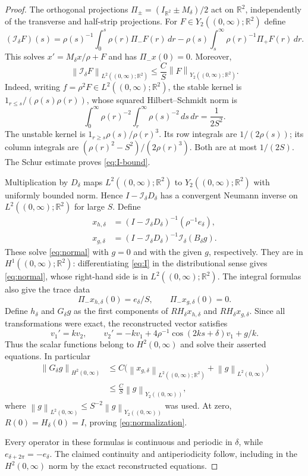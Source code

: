 \documentclass[11pt,a4paper]{article}
\newcommand{\R}{\mathbb R}
\newcommand{\Ical}{\mathcal I}
\newcommand{\norm}[1]{\left\lVert#1\right\rVert}
\begin{document}
\begin{proof}
The orthogonal projections $\Pi_\pm=(I_{\R^2}\pm M_\delta)/2$ act on
$\R^2$, independently of the transverse and half-strip projections.
For $F\in Y_2((0,\infty);\R^2)$ define
\begin{equation}\label{eq:I}
 (\Ical_\delta F)(s)
 =\rho(s)^{-1}\int_0^s\rho(r)\Pi_-F(r)\,dr
  -\rho(s)\int_s^\infty\rho(r)^{-1}\Pi_+F(r)\,dr.
\end{equation}
This solves $x'=M_\delta x/\rho+F$ and has $\Pi_-x(0)=0$. Moreover,
\begin{equation}\label{eq:I-bound}
 \norm{\Ical_\delta F}_{L^2((0,\infty);\R^2)}
 \le\frac CS\norm{F}_{Y_2((0,\infty);\R^2)}.
\end{equation}
Indeed, writing $f=\rho^2F\in L^2((0,\infty);\R^2)$, the stable kernel is
$1_{r\le s}/(\rho(s)\rho(r))$, whose squared Hilbert--Schmidt norm is
\[
 \int_0^\infty\rho(r)^{-2}\int_r^\infty\rho(s)^{-2}\,ds\,dr
 =\frac1{2S^2}.
\]
The unstable kernel is $1_{r\ge s}\rho(s)/\rho(r)^3$.
Its row integrals are $1/(2\rho(s))$; its column integrals are
$(\rho(r)^2-S^2)/(2\rho(r)^3)$. Both are at most $1/(2S)$.
The Schur estimate proves \eqref{eq:I-bound}.

Multiplication by $D_\delta$ maps $L^2((0,\infty);\R^2)$ to
$Y_2((0,\infty);\R^2)$ with uniformly bounded norm.
Hence $I-\Ical_\delta D_\delta$ has a convergent Neumann inverse on
$L^2((0,\infty);\R^2)$ for large $S$. Define
\begin{align*}
 x_{h,\delta}&=(I-\Ical_\delta D_\delta)^{-1}(\rho^{-1}e_\delta),\\
 x_{g,\delta}&=(I-\Ical_\delta D_\delta)^{-1}
                         \Ical_\delta(B_\delta g).
\end{align*}
These solve \eqref{eq:normal} with $g=0$ and with the given $g$,
respectively. They are in $H^1((0,\infty);\R^2)$:
differentiating \eqref{eq:I} in the distributional sense gives
\eqref{eq:normal}, whose right-hand side is in $L^2((0,\infty);\R^2)$. The integral formulas also give the trace data
\[
 \Pi_-x_{h,\delta}(0)=e_\delta/S,\qquad
 \Pi_-x_{g,\delta}(0)=0.
\]
Define $h_\delta$ and $G_\delta g$ as the first components of
$RH_\delta x_{h,\delta}$ and $RH_\delta x_{g,\delta}$.
Since all transformations were exact, the reconstructed vector satisfies
\[
 v_1'=kv_2,\qquad
 v_2'=-kv_1+4\rho^{-1}\cos(2ks+\delta)v_1+g/k.
\]
Thus the scalar functions belong to $H^2(0,\infty)$ and solve their
asserted equations. In particular
\[
 \begin{aligned}
 \norm{G_\delta g}_{H^2(0,\infty)}
 &\le C\bigl(\norm{x_{g,\delta}}_{L^2((0,\infty);\R^2)}
                +\norm{g}_{L^2(0,\infty)}\bigr)\\
 &\le\frac CS\norm{g}_{Y_2((0,\infty))},
 \end{aligned}
\]
where $\norm{g}_{L^2(0,\infty)}
\le S^{-2}\norm{g}_{Y_2((0,\infty))}$ was used.
At zero, $R(0)=H_\delta(0)=I$, proving \eqref{eq:normalization}.

Every operator in these formulas is continuous and periodic in $\delta$,
while $e_{\delta+2\pi}=-e_\delta$. The claimed continuity and
antiperiodicity follow, including in the $H^2(0,\infty)$ norm by the exact
reconstructed equations.
\end{proof}
\end{document}
